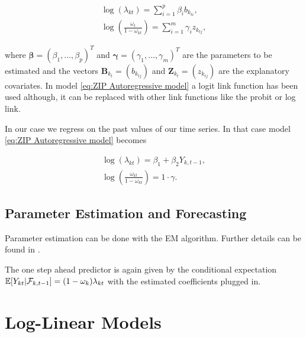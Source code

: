 \begin{equation}
\begin{gathered}
\log(\lambda_{kt}) = \sum_{i=1}^p\beta_i b_{k_{ti}},\\ %
\log\left(\frac{\omega_{t}}{1-\omega_{kt}}\right)=\sum_{i=1}^m\gamma_i z_{k_{tj}},%
\label{eq:ZIP Autoregressive model}
\end{gathered}
\end{equation}

where $\bm{\beta} = (\beta_1,\ldots,\beta_p)^T$ and $\bm{\gamma}=(\gamma_1,\ldots,\gamma_m)^T$ are the parameters to be estimated and the vectors $\bm{B}_{k_t}=(b_{k_{tj}})$ and $\bm{Z}_{k_t}=(z_{k_{tj}})$ are the explanatory covariates. In model \ref{eq:ZIP Autoregressive model} a logit link function has been used although, it can be replaced with other link functions like the probit or log link. 

In our case we regress on the past values of our time series. In that case model \ref{eq:ZIP Autoregressive model} becomes

\begin{equation}
\begin{gathered}
\log(\lambda_{kt}) = \beta_1 + \beta_2 Y_{k,t-1},\\%
\log\left(\frac{\omega_{kt}}{1-\omega_{kt}}\right)= 1 \cdot \gamma.
\label{eq:ZIP Autoregressive model timeseries}
\end{gathered}
\end{equation}


\subsection{Parameter Estimation and Forecasting}
\label{sec: ZIM Parameter Estimation and Forecasting}

Parameter estimation can be done with the EM algorithm. Further details can be found in \cite{Lambert:1992}.

The one step ahead predictor is again given by the conditional expectation $\mathbb{E}[Y_{kt} | \mathcal{F}_{k,t-1}] = (1-\omega_k)\lambda_{kt} $ with the estimated coefficients plugged in. 

\section{Log-Linear Models}
\label{sec: Log-Linear Models}

